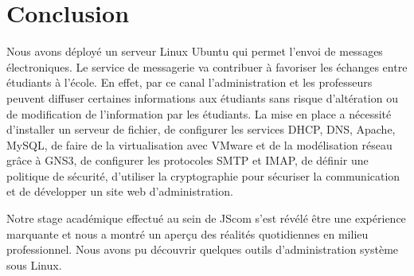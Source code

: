 \documentclass[a4paper,12pt,french]{report} %
\begin{document}
\chapter*{Conclusion}
Nous avons déployé un serveur Linux Ubuntu qui permet l'envoi de messages électroniques. Le service de messagerie va contribuer à favoriser les échanges entre étudiants à l'école. En effet, par ce canal l'administration et les professeurs peuvent diffuser certaines informations aux étudiants sans risque d'altération ou de modification de l'information par les étudiants. La mise en place a nécessité d'installer un serveur de fichier, de configurer les services DHCP, DNS, Apache, MySQL, de faire de la virtualisation avec VMware et de la modélisation réseau grâce à GNS3, de configurer les protocoles SMTP et IMAP, de définir une politique de sécurité, d'utiliser la cryptographie pour sécuriser la communication et de développer un site web d'administration.

Notre stage académique effectué au sein de JScom s'est révélé être une expérience marquante et nous a montré un aperçu des réalités quotidiennes en milieu professionnel. Nous avons pu découvrir quelques outils d'administration système sous Linux. 

\nocite{ref1}
\nocite{ref2}
\nocite{ref3}
\nocite{ref4}
\nocite{ref5}
\nocite{ref6}
\nocite{ref7}
\nocite{ref8}
\nocite{ref9}
\nocite{ref10}
\nocite{ref11}
\nocite{ref12}
\nocite{ref13}
\nocite{ref14}
\nocite{ref15}
\nocite{ref16}

\end{document}
